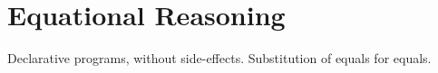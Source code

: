 
\section{Equational Reasoning}
Declarative programs, without side-effects. Substitution of equals for equals.
